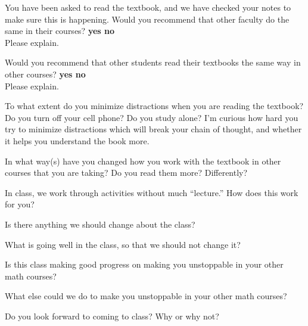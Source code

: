 \anonymous


\blist{0.5in}
\item You have been asked to read the textbook, and we have checked your notes to make sure this is happening.
Would you recommend that other faculty do the same in their courses?
{\bf yes \quad no}
\\
Please explain.
\vspace*{0.5in}

Would you recommend that other students read their textbooks the same way in other courses?
{\bf yes \quad no}
\\
Please explain.


\item To what extent do you minimize distractions when you are reading the textbook?  Do you turn off your cell phone?  Do you study alone?  I'm curious how hard you try to minimize distractions which will break your chain of thought, and whether it helps you understand the book more.

\item In what way(s) have you changed how you work with the textbook in other courses that you are taking?  Do you read them more?  Differently?

\item In class, we work through activities without much ``lecture.''
How does this work for you?

\item Is there anything we should change about the class?

\item What is going well in the class, so that we should not change it?

\item Is this class making good progress on making you unstoppable in your other math courses?

\item What else could we do to make you unstoppable in your other math courses?

\item Do you look forward to coming to class?  Why or why not?

\elist
\vfill          %
